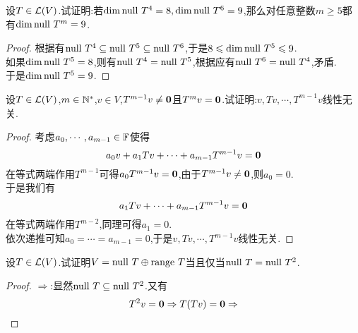 \documentclass{ctexart}
\begin{document}
\pagestyle{empty}
\begin{center}
    \large{}
\end{center}
\begin{problem}[1.]
    设$T\in\mathcal{L}(V)$.试证明:若$\dim\text{null } T^4=8,\dim\text{null } T^6=9$,那么对任意整数$m\geqslant5$都有$\dim\text{null } T^m=9$.
\end{problem}
\begin{proof}
    根据有$\text{null } T^4\subseteq\text{null } T^5\subseteq\text{null } T^6$,于是$8\leqslant\dim\text{null } T^5\leqslant9$.\\
    如果$\dim\text{null } T^5=8$,则有$\text{null } T^4=\text{null } T^5$,根据应有$\text{null } T^6=\text{null } T^4$,矛盾.\\
    于是$\dim\text{null } T^5=9$.
\end{proof}
\begin{problem}[2.]
    设$T\in\mathcal{L}(V)$,$m\in\mathbb{N}^*$,$v\in V$,$T^{m-1}v\neq\mathbf0$且$T^mv=\mathbf0$.试证明:$v,Tv,\cdots,T^{m-1}v$线性无关.
\end{problem}
\begin{proof}
    考虑$a_0,\cdots,a_{m-1}\in\mathbb{F}$使得
    \[a_0v+a_1Tv+\cdots+a_{m-1}T^{m-1}v=\mathbf0\]
    在等式两端作用$T^{m-1}$可得$a_0T^{m-1}v=\mathbf0$,由于$T^{m-1}v\neq\mathbf0$,则$a_0=0$.\\
    于是我们有
    \[a_1Tv+\cdots+a_{m-1}T^{m-1}v=\mathbf0\]
    在等式两端作用$T^{m-2}$,同理可得$a_1=0$.\\
    依次递推可知$a_0=\cdots=a_{m-1}=0$,于是$v,Tv,\cdots,T^{m-1}v$线性无关.
\end{proof}
\begin{problem}[3.]
    设$T\in\mathcal{L}(V)$.试证明$V=\text{null } T\oplus\text{range } T$当且仅当$\text{null } T=\text{null } T^2$.
\end{problem}
\begin{proof}
    $\Rightarrow$:显然$\text{null } T\subseteq\text{null } T^2$.又有
    \[T^2v=\mathbf0\Rightarrow T(Tv)=\mathbf0\Rightarrow\]
\end{proof}
\end{document}
